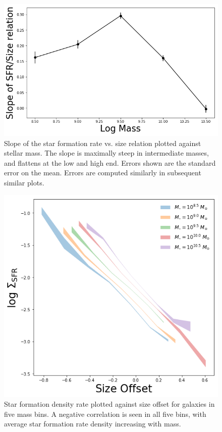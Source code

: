 \documentclass[iop]{emulateapj}
\begin{document}
\begin{figure}
	\centering
	\includegraphics[width= \columnwidth]{slope_sfr_size.png}
	\caption{Slope of the star formation rate vs. size relation plotted against stellar mass. The slope is maximally steep in intermediate masses, and flattens at the low and high end. Errors shown are the standard error on the mean. Errors are computed similarly in subsequent similar plots.}
	\label{fig:HA_lum_mass}
	
\end{figure}

\begin{figure}
	\centering
	\includegraphics[width=1.5 \columnwidth]{ha_lum_dens.png}
	\caption{Star formation density rate plotted against size offset for galaxies in five mass bins. A negative correlation is seen in all five bins, with average star formation rate density increasing with mass. }
	\label{fig:sfrdens}
	
\end{figure}
\end{document}
